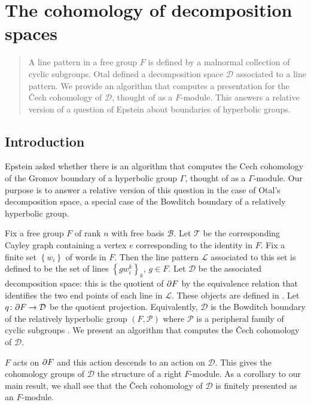 \chapter{The cohomology of decomposition spaces}

\begin{abstract} A line pattern in a free group $F$ is defined by a malnormal
collection of cyclic subgroups. Otal defined a decomposition space
$\mathcal{D}$ associated to a line pattern. We provide an algorithm that
computes a presentation for the \v{C}ech cohomology of $\mathcal{D}$, thought
of as a $F$-module. This answers a relative version of a question of Epstein
about boundaries of hyperbolic groups. \end{abstract}

\section{Introduction}

Epstein asked whether there is an algorithm that computes the Cech cohomology
of the Gromov boundary of a hyperbolic group $\Gamma$, thought of as a
$\Gamma$-module.  Our purpose is to answer a relative version of this question
in the case of Otal's decomposition space, a special case of the Bowditch
boundary of a relatively hyperbolic group.

Fix a free group $F$ of rank $n$ with free basis $\mathcal{B}$. Let
$\mathcal{T}$ be the corresponding Cayley graph containing a vertex $e$
corresponding to the identity in $F$. Fix a finite set $\left\{w_i
\right\}$ of words in $F$. Then the line pattern $\mathcal{L}$ associated
to this set is defined to be the set of lines $\left\{gw_i^k\right\}_k$, $g
\in F$. Let $\mathcal{D}$ be the associated decomposition space: this is the
quotient of $\partial F$ by the equivalence relation that identifies the two
end points of each line in $\mathcal{L}$. These objects are defined in
\cite{otal92}. Let $q \colon \partial F \to \mathcal{D}$ be the quotient
projection. Equivalently, $\mathcal{D}$ is the Bowditch boundary of the
relatively hyperbolic group $(F, \mathcal{P})$ where $\mathcal{P}$ is a
peripheral family of cyclic subgroups \cite{manning15}. We present an algorithm
that computes the \v{C}ech cohomology of $\mathcal{D}$.

$F$ acts on $\partial F$ and this action descends to an action on
$\mathcal{D}$. This gives the cohomology groups of $\mathcal{D}$ the
structure of a right $F$-module. As a corollary to our main result, we shall
see that the \v{C}ech cohomology of $\mathcal{D}$ is finitely presented as an
$F$-module. 

